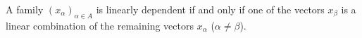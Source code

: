 A family $(x_\alpha)_{\alpha \in A}$ is linearly dependent if and only if one of the vectors $x_\beta$ is a linear combination of the remaining vectors $x_\alpha$ ($\alpha \neq \beta$).
